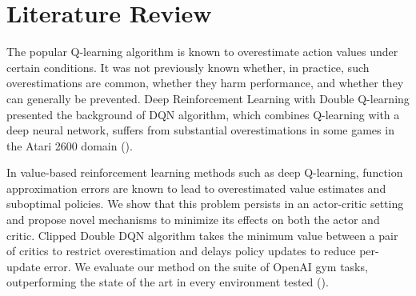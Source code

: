 \documentclass{article}
\begin{document}
\section{Literature Review}

The popular Q-learning algorithm is known to overestimate action values under
certain conditions. It was not previously known whether, in practice, such
overestimations are common, whether they harm performance, and whether they can
generally be prevented. Deep Reinforcement Learning with Double Q-learning
presented the background of DQN algorithm, which combines Q-learning with a deep
neural network, suffers from substantial overestimations in some games in the
Atari 2600 domain (\citet{mnih2013playing}).

In value-based reinforcement learning methods such as deep Q-learning, function
approximation errors are known to lead to overestimated value estimates and
suboptimal policies. We show that this problem persists in an actor-critic
setting and propose novel mechanisms to minimize its effects on both the actor
and critic. Clipped Double DQN algorithm takes the minimum value between a pair
of critics to restrict overestimation and delays policy updates to reduce
per-update error. We evaluate our method on the suite of OpenAI gym tasks,
outperforming the state of the art in every environment tested
(\citet{fujimoto2018addressing}).


\end{document}

